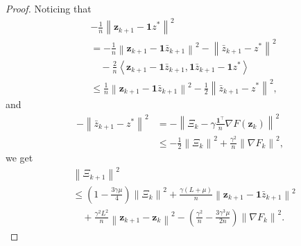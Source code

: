 \documentclass[10pt,a4paper]{amsart}
\begin{document}
\begin{proof}
Noticing that 
\begin{equation*}
\begin{aligned}
&-\frac{1}{n}\left\| \mathbf{z}_{k+1}-\mathbf{1}z^* \right\| ^2
\\
&=-\frac{1}{n}\left\| \mathbf{z}_{k+1}-\mathbf{1}\bar{z}_{k+1} \right\| ^2-\left\| \bar{z}_{k+1}-z^* \right\| ^2
\\
&\quad -\frac{2}{n}\left< \mathbf{z}_{k+1}-\mathbf{1}\bar{z}_{k+1},\mathbf{1}\bar{z}_{k+1}-\mathbf{1}z^* \right> 
\\
&\leqslant \frac{1}{n}\left\| \mathbf{z}_{k+1}-\mathbf{1}\bar{z}_{k+1} \right\| ^2-\frac{1}{2}\left\| \bar{z}_{k+1}-z^* \right\| ^2,
\end{aligned}
\end{equation*}
and
\begin{equation*}
\begin{aligned}
-\left\| \bar{z}_{k+1}-z^* \right\| ^2
&=-\left\| \varXi _k-\gamma \frac{\mathbf{1}^{\top}}{n}\nabla F\left( \mathbf{z}_k \right) \right\| ^2
\\
&\leqslant -\frac{1}{2}\left\| \varXi _k \right\| ^2+\frac{\gamma ^2}{n}\left\| \nabla F_k \right\| ^2,
\end{aligned}
\end{equation*}
we get
\begin{equation*}
\begin{aligned}
&\left\| \varXi _{k+1} \right\| ^2
\\
&\leqslant \left( 1-\frac{3\gamma \mu}{4} \right) \left\| \varXi _k \right\| ^2+\frac{\gamma \left( L+\mu \right)}{n}\left\| \mathbf{z}_{k+1}-\mathbf{1}\bar{z}_{k+1} \right\| ^2
\\
&\quad+\frac{\gamma ^2L^2}{n}\left\| \mathbf{z}_{k+1}-\mathbf{z}_k \right\| ^2-\left( \frac{\gamma ^2}{n}-\frac{3\gamma ^3\mu}{2n} \right) \left\| \nabla F_k \right\| ^2.
\end{aligned}
\end{equation*}


\end{proof}
\end{document}
